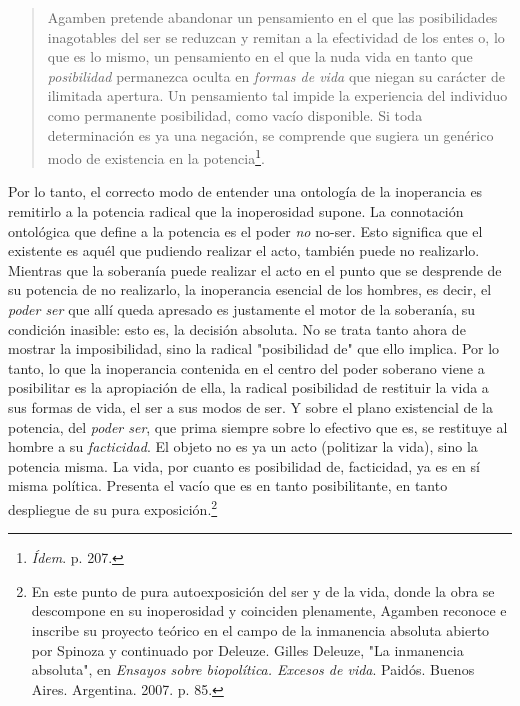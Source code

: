 \documentclass{book}
\begin{document}
\begin{quote}
Agamben pretende abandonar un pensamiento en el que las posibilidades
inagotables del ser se reduzcan y remitan a la efectividad de los entes
o, lo que es lo mismo, un pensamiento en el que la nuda vida en tanto
que \emph{posibilidad} permanezca oculta en \emph{formas de vida} que
niegan su carácter de ilimitada apertura. Un pensamiento tal impide la
experiencia del individuo como permanente posibilidad, como vacío
disponible. Si toda determinación es ya una negación, se comprende que
sugiera un genérico modo de existencia en la potencia\footnote{\emph{Ídem}.
  p. 207.}.
\end{quote}

Por lo tanto, el correcto modo de entender una ontología de la
inoperancia es remitirlo a la potencia radical que la inoperosidad
supone. La connotación ontológica que define a la potencia es el poder
\emph{no} no-ser. Esto significa que el existente es aquél que pudiendo
realizar el acto, también puede no realizarlo. Mientras que la soberanía
puede realizar el acto en el punto que se desprende de su potencia de no
realizarlo, la inoperancia esencial de los hombres, es decir, el
\emph{poder ser} que allí queda apresado es justamente el motor de la
soberanía, su condición inasible: esto es, la decisión absoluta. No se
trata tanto ahora de mostrar la imposibilidad, sino la radical
"posibilidad de" que ello implica. Por lo tanto, lo que la inoperancia
contenida en el centro del poder soberano viene a posibilitar es la
apropiación de ella, la radical posibilidad de restituir la vida a sus
formas de vida, el ser a sus modos de ser. Y sobre el plano existencial
de la potencia, del \emph{poder ser}, que prima siempre sobre lo
efectivo que es, se restituye al hombre a su \emph{facticidad}. El
objeto no es ya un acto (politizar la vida), sino la potencia misma. La
vida, por cuanto es posibilidad de, facticidad, ya es en sí misma
política. Presenta el vacío que es en tanto posibilitante, en tanto
despliegue de su pura exposición.\footnote{En este punto de pura
  autoexposición del ser y de la vida, donde la obra se descompone en su
  inoperosidad y coinciden plenamente, Agamben reconoce e inscribe su
  proyecto teórico en el campo de la inmanencia absoluta abierto por
  Spinoza y continuado por Deleuze. Gilles Deleuze, "La inmanencia
  absoluta", en \emph{Ensayos sobre biopolítica. Excesos de vida}.
  Paidós. Buenos Aires. Argentina. 2007. p. 85.}
\end{document}
